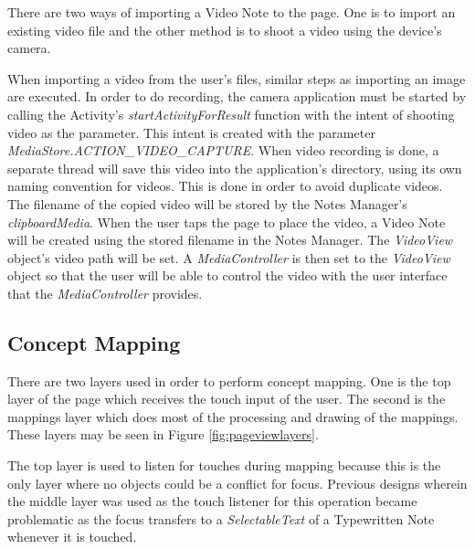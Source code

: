 There are two ways of importing a Video Note to the page. One is to import an existing video file and the other method is to shoot a video using the device's camera. 

When importing a video from the user's files, similar steps as importing an image are executed. In order to do recording, the camera application must be started by calling the Activity's \textit{startActivityForResult} function with the intent of shooting video as the parameter. This intent is created with the parameter \textit{MediaStore.ACTION\_VIDEO\_CAPTURE}. When video recording is done, a separate thread will save this video into the application's directory, using its own naming convention for videos. This is done in order to avoid duplicate videos. The filename of the copied video will be stored by the Notes Manager's \textit{clipboardMedia}.  When the user taps the page to place the video, a Video Note will be created using the stored filename in the Notes Manager. The \textit{VideoView} object's video path will be set. A \textit{MediaController} is then set to the \textit{VideoView} object so that the user will be able to control the video with the user interface that the \textit{MediaController} provides.

\subsection{Concept Mapping}
\label{sec:conceptmapping}

There are two layers used in order to perform concept mapping. One is the top layer of the page which receives the touch input of the user. The second is the mappings layer which does most of the processing and drawing of the mappings. These layers may be seen in Figure \ref{fig:pageviewlayers}.

The top layer is used to listen for touches during mapping because this is the only layer where no objects could be a conflict for focus. Previous designs wherein the middle layer was used as the touch listener for this operation became problematic as the focus transfers to a \textit{SelectableText} of a Typewritten Note whenever it is touched. 

